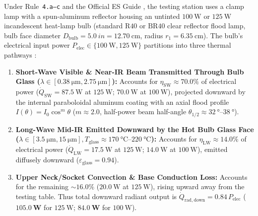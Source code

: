 Under Rule~\texttt{4.a--c} and the Official ES Guide , the testing station uses a clamp lamp with a spun-aluminum reflector housing an untinted $\SI{100}{\watt}$ or $\SI{125}{\watt}$ incandescent heat-lamp bulb (standard $\mathrm{R40}$ or $\mathrm{BR40}$ clear reflector flood lamp, bulb face diameter $D_{\mathrm{bulb}} = \SI{5.0}{in} = \SI{12.70}{\centi\meter}$, radius $r_1 = \SI{6.35}{\centi\meter}$). The bulb's electrical input power $P_{\mathrm{elec}} \in \{\SI{100}{\watt}, \SI{125}{\watt}\}$ partitions into three thermal pathways :
\begin{enumerate}
  \item \textbf{Short-Wave Visible \& Near-IR Beam Transmitted Through Bulb Glass ($\lambda \in [\SI{0.38}{\micro\meter}, \SI{2.75}{\micro\meter}]$):} Accounts for $\eta_{\mathrm{SW}} \approx 70.0\%$ of electrical power ($\dot{Q}_{\mathrm{SW}} = \SI{87.5}{\watt}$ at $\SI{125}{\watt}$; $\SI{70.0}{\watt}$ at $\SI{100}{\watt}$), projected downward by the internal paraboloidal aluminum coating with an axial flood profile $I(\theta) = I_0\cos^m\theta$ ($m \approx 2.0$, half-power beam half-angle $\theta_{1/2} \approx \SIrange{32}{38}{\degree}$).
  \item \textbf{Long-Wave Mid-IR Emitted Downward by the Hot Bulb Glass Face ($\lambda \in [\SI{3.5}{\micro\meter}, \SI{15}{\micro\meter}], T_{\mathrm{glass}} \approx \SIrange{170}{220}{\celsius}$):} Accounts for $\eta_{\mathrm{LW}} \approx 14.0\%$ of electrical power ($\dot{Q}_{\mathrm{LW}} = \SI{17.5}{\watt}$ at $\SI{125}{\watt}$; $\SI{14.0}{\watt}$ at $\SI{100}{\watt}$), emitted diffusely downward ($\varepsilon_{\mathrm{glass}} = 0.94$).
  \item \textbf{Upper Neck/Socket Convection \& Base Conduction Loss:} Accounts for the remaining $\sim 16.0\%$ ($\SI{20.0}{\watt}$ at $\SI{125}{\watt}$), rising upward away from the testing table. Thus total downward radiant output is $\dot{Q}_{\mathrm{rad,down}} = 0.84\,P_{\mathrm{elec}}$ ($\mathbf{\SI{105.0}{\watt}}$ for $\SI{125}{\watt}$; $\mathbf{\SI{84.0}{\watt}}$ for $\SI{100}{\watt}$).
\end{enumerate}

